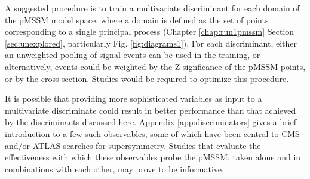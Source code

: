 A suggested procedure is to train a multivariate discriminant for each domain of the pMSSM model space, where a domain is defined as the set of points corresponding to a single principal process (Chapter \ref{chap:run1pmssm} Section \ref{sec:unexplored}, particularly Fig. \ref{fig:diagrams1}). For each discriminant, either an unweighted pooling of signal events can be used in the training, or alternatively, events could be weighted by the Z-signficance of the pMSSM points, or by the cross section. Studies would be required to optimize this procedure.

It is possible that providing more sophisticated variables as input to a multivariate discriminate could result in better performance than that achieved by the discriminants discussed here. Appendix \ref{app:discriminators} gives a brief introduction to a few such observables, some of which have been central to CMS and/or ATLAS searches for supersymmetry. Studies that evaluate the effectiveness with which these observables probe the pMSSM, taken alone and in combinations with each other, may prove to be informative.




